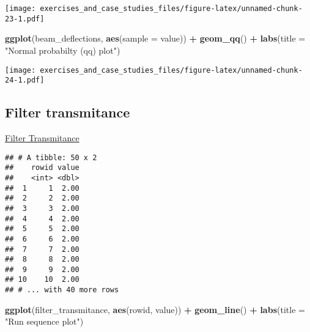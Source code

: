 \documentclass[]{book}
\newenvironment{Shaded}{\begin{snugshade}}{\end{snugshade}}
\newcommand{\DataTypeTok}[1]{\textcolor[rgb]{0.13,0.29,0.53}{#1}}
\newcommand{\DecValTok}[1]{\textcolor[rgb]{0.00,0.00,0.81}{#1}}
\newcommand{\KeywordTok}[1]{\textcolor[rgb]{0.13,0.29,0.53}{\textbf{#1}}}
\newcommand{\NormalTok}[1]{#1}
\newcommand{\OperatorTok}[1]{\textcolor[rgb]{0.81,0.36,0.00}{\textbf{#1}}}
\newcommand{\StringTok}[1]{\textcolor[rgb]{0.31,0.60,0.02}{#1}}
\theoremstyle{definition}
\theoremstyle{definition}
\theoremstyle{definition}
\theoremstyle{remark}
\begin{document}
\texttt{[image: exercises\_and\_case\_studies\_files/figure-latex/unnamed-chunk-23-1.pdf]}

\begin{Shaded}
\begin{Highlighting}[]
\KeywordTok{ggplot}\NormalTok{(beam_deflections, }\KeywordTok{aes}\NormalTok{(}\DataTypeTok{sample =}\NormalTok{ value)) }\OperatorTok{+}
\StringTok{  }\KeywordTok{geom_qq}\NormalTok{() }\OperatorTok{+}
\StringTok{  }\KeywordTok{labs}\NormalTok{(}\DataTypeTok{title =} \StringTok{"Normal probabilty (qq) plot"}\NormalTok{)}
\end{Highlighting}
\end{Shaded}

\texttt{[image: exercises\_and\_case\_studies\_files/figure-latex/unnamed-chunk-24-1.pdf]}

\hypertarget{filter-transmitance}{%
\subsection{Filter transmitance}\label{filter-transmitance}}

\href{https://www.itl.nist.gov/div898/handbook/eda/section4/eda426.htm}{Filter
Transmitance}

\begin{Shaded}
\end{Shaded}

\begin{verbatim}
## # A tibble: 50 x 2
##    rowid value
##    <int> <dbl>
##  1     1  2.00
##  2     2  2.00
##  3     3  2.00
##  4     4  2.00
##  5     5  2.00
##  6     6  2.00
##  7     7  2.00
##  8     8  2.00
##  9     9  2.00
## 10    10  2.00
## # ... with 40 more rows
\end{verbatim}

\begin{Shaded}
\begin{Highlighting}[]
\KeywordTok{ggplot}\NormalTok{(filter_transmitance, }\KeywordTok{aes}\NormalTok{(rowid, value)) }\OperatorTok{+}
\StringTok{  }\KeywordTok{geom_line}\NormalTok{() }\OperatorTok{+}
\StringTok{  }\KeywordTok{labs}\NormalTok{(}\DataTypeTok{title =} \StringTok{"Run sequence plot"}\NormalTok{)}
\end{Highlighting}
\end{Shaded}
\end{document}
